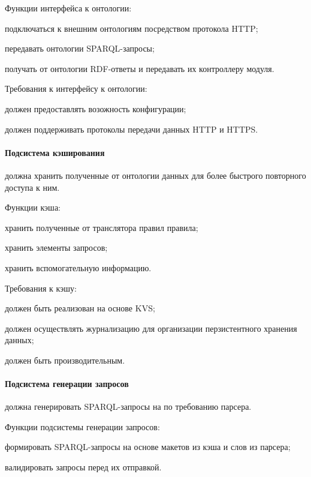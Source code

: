 Функции интерфейса к онтологии:
\begin{list}{}{\leftmargin=1.5cm}
  \item подключаться к внешним онтологиям посредством протокола HTTP;
  \item передавать онтологии SPARQL-запросы;
  \item получать от онтологии RDF-ответы и передавать их контроллеру модуля.
\end{list}

Требования к интерфейсу к онтологии:
\begin{list}{}{\leftmargin=1.5cm}
  \item должен предоставлять возожность конфигурации;
  \item должен поддерживать протоколы передачи данных HTTP и HTTPS.
\end{list}

\paragraph{Подсистема кэширования} должна хранить полученные от онтологии данных для более быстрого повторного доступа к ним.

Функции кэша:
\begin{list}{}{\leftmargin=1.5cm}
  \item хранить полученные от транслятора правил правила;
  \item хранить элементы запросов;
  \item хранить вспомогательную информацию.
\end{list}

Требования к кэшу:
\begin{list}{}{\leftmargin=1.5cm}
  \item должен быть реализован на основе KVS;
  \item должен осуществлять журнализацию для организации перзистентного хранения данных;
  \item должен быть производительным.
\end{list}

\paragraph{Подсистема генерации запросов} должна генерировать SPARQL-запросы на по требованию парсера.

Функции подсистемы генерации запросов:
\begin{list}{}{\leftmargin=1.5cm}
  \item формировать SPARQL-запросы на основе макетов из кэша и слов из парсера;
  \item валидировать запросы перед их отправкой.
\end{list}

